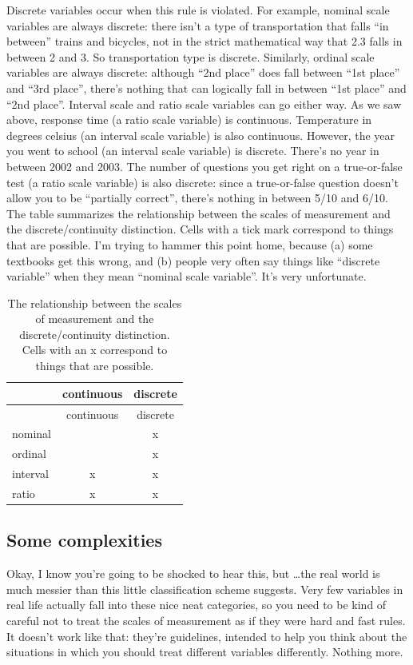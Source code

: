 \documentclass[
]{book}
\begin{document}
Discrete variables occur when this rule is violated. For example, nominal scale variables are always discrete: there isn't a type of transportation that falls ``in between'' trains and bicycles, not in the strict mathematical way that 2.3 falls in between 2 and 3. So transportation type is discrete. Similarly, ordinal scale variables are always discrete: although ``2nd place'' does fall between ``1st place'' and ``3rd place'', there's nothing that can logically fall in between ``1st place'' and ``2nd place''. Interval scale and ratio scale variables can go either way. As we saw above, response time (a ratio scale variable) is continuous. Temperature in degrees celsius (an interval scale variable) is also continuous. However, the year you went to school (an interval scale variable) is discrete. There's no year in between 2002 and 2003. The number of questions you get right on a true-or-false test (a ratio scale variable) is also discrete: since a true-or-false question doesn't allow you to be ``partially correct'', there's nothing in between 5/10 and 6/10. The table summarizes the relationship between the scales of measurement and the discrete/continuity distinction. Cells with a tick mark correspond to things that are possible. I'm trying to hammer this point home, because (a) some textbooks get this wrong, and (b) people very often say things like ``discrete variable'' when they mean ``nominal scale variable''. It's very unfortunate.

\begin{longtable}[]{@{}lcc@{}}
\caption{The relationship between the scales of measurement and the discrete/continuity distinction. Cells with an x correspond to things that are possible.}\tabularnewline
\toprule
& continuous & discrete\tabularnewline
\midrule
\endfirsthead
\toprule
& continuous & discrete\tabularnewline
\midrule
\endhead
nominal & & x\tabularnewline
ordinal & & x\tabularnewline
interval & x & x\tabularnewline
ratio & x & x\tabularnewline
\bottomrule
\end{longtable}

\hypertarget{some-complexities}{%
\subsection{Some complexities}\label{some-complexities}}

Okay, I know you're going to be shocked to hear this, but \ldots the real world is much messier than this little classification scheme suggests. Very few variables in real life actually fall into these nice neat categories, so you need to be kind of careful not to treat the scales of measurement as if they were hard and fast rules. It doesn't work like that: they're guidelines, intended to help you think about the situations in which you should treat different variables differently. Nothing more.
\end{document}
